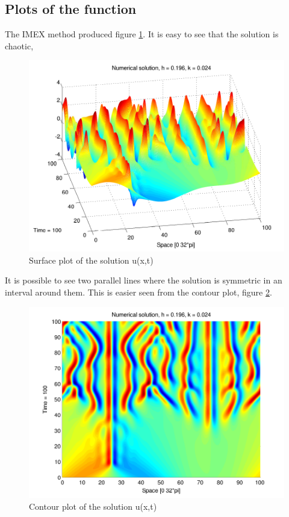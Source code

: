 \subsection{Plots of the function}
The IMEX method produced figure \ref{fig:surface}. It is easy to see that the solution is chaotic,

\begin{figure}[H]
\centering
\includegraphics[scale=0.7]
{../PDFs/IMEX/KS_plot_surface.pdf}
\caption{Surface plot of the solution u(x,t)}
\label{fig:surface}
\end{figure}

It is possible to see two parallel lines where the solution is symmetric in an interval around them. This is easier seen from the contour plot, figure \ref{fig:contour}.

\begin{figure}[H]
\centering
\includegraphics[scale=0.65]
{../PDFs/IMEX/KS_plot_contour.pdf}
\caption{Contour plot of the solution u(x,t)}
\label{fig:contour}
\end{figure}

